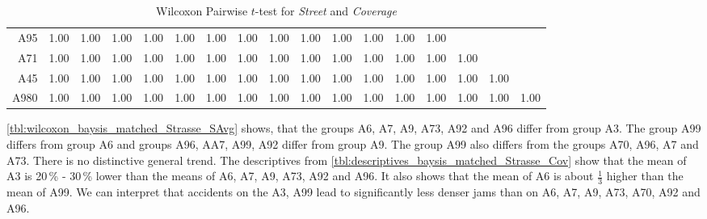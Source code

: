 \begin{table}[ht]
\begin{tabular}{rrrrrrrrrrrrrrrrr}
	  	A95 	& 1.00 & 1.00 & 1.00 & 1.00 & 1.00 & 1.00 & 1.00 & 1.00 & 1.00 & 1.00 & 1.00 & 1.00 & 1.00 &  &  &  \\ 
	  	A71 	& 1.00 & 1.00 & 1.00 & 1.00 & 1.00 & 1.00 & 1.00 & 1.00 & 1.00 & 1.00 & 1.00 & 1.00 & 1.00 & 1.00 &  &  \\ 
	  	A45 	& 1.00 & 1.00 & 1.00 & 1.00 & 1.00 & 1.00 & 1.00 & 1.00 & 1.00 & 1.00 & 1.00 & 1.00 & 1.00 & 1.00 & 1.00 &  \\ 
	  	A980 	& 1.00 & 1.00 & 1.00 & 1.00 & 1.00 & 1.00 & 1.00 & 1.00 & 1.00 & 1.00 & 1.00 & 1.00 & 1.00 & 1.00 & 1.00 & 1.00 \\ 
	   	\bottomrule
	\end{tabular}
	\caption{Wilcoxon Pairwise $t$-test for \textit{Street} and \textit{Coverage}}
	\label{tbl:wilcoxon_baysis_matched_Strasse_Cov}
\end{table}
\autoref{tbl:wilcoxon_baysis_matched_Strasse_SAvg} shows, that the groups A6, A7, A9, A73, A92 and A96 differ from group A3. The group A99 differs from group A6 and groups A96, AA7, A99, A92 differ from group A9. The group A99 also differs from the groups A70, A96, A7 and A73. There is no distinctive general trend. The descriptives from \autoref{tbl:descriptives_baysis_matched_Strasse_Cov} show that the mean of A3 is 20\,\% - 30\,\% lower than the means of A6, A7, A9, A73, A92 and A96. It also shows that the mean of A6 is about $\frac{1}{3}$ higher than the mean of A99. We can interpret that accidents on the A3, A99 lead to significantly less denser jams than on A6, A7, A9, A73, A70, A92 and A96.
